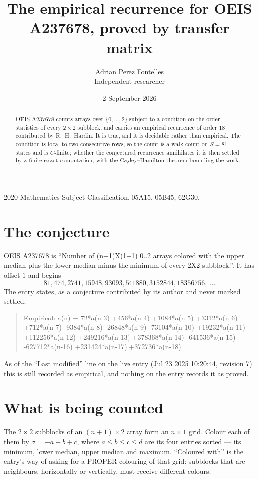 \documentclass[11pt,a4paper]{article}
\title{The empirical recurrence for OEIS A237678, proved by transfer matrix}
\author{Adrian Perez Fontelles\\ \small Independent researcher}
\date{2 September 2026}
\theoremstyle{plain}
\theoremstyle{definition}
\begin{document}
\maketitle

\begin{abstract}
OEIS A237678 counts arrays over $\{0,\dots,2\}$ subject to a condition on the order
statistics of every $2\times2$ subblock, and carries an empirical recurrence of order
$18$ contributed by R.~H.~Hardin. It is true, and it is decidable rather than empirical.
The condition is local to two consecutive rows, so the count is a walk count on $S=81$
states and is $C$-finite; whether the conjectured recurrence annihilates it is then settled by
a finite exact computation, with the Cayley--Hamilton theorem bounding the work.
\end{abstract}

\noindent\small 2020 Mathematics Subject Classification. 05A15, 05B45, 62G30.\normalsize

\section{The conjecture}

OEIS A237678 is ``Number of (n+1)X(1+1) 0..2 arrays colored with the upper median plus the lower median minus the minimum of every 2X2 subblock.''. It has offset $1$ and begins
\[
81, 474, 2741, 15948, 93093, 541880, 3152844, 18356756,\ \dots
\]
The entry states, as a conjecture contributed by its author and never marked settled:
\begin{quote}
Empirical: a(n) = 72*a(n-3) +456*a(n-4) +1084*a(n-5) +3312*a(n-6) +712*a(n-7) -9384*a(n-8) -26848*a(n-9) -73104*a(n-10) +19232*a(n-11) +112256*a(n-12) +249216*a(n-13) +378368*a(n-14) -641536*a(n-15) -627712*a(n-16) +231424*a(n-17) +372736*a(n-18)
\end{quote}
As of the ``Last modified'' line on the live entry (Jul 23 2025 10:20:44, revision 7) this is still
recorded as empirical, and nothing on the entry records it as proved.

\section{What is being counted}

The $2\times2$ subblocks of an $(n+1)\times2$ array form an
$n\times1$ grid. Colour each of them by $\sigma=-a+b+c$, where $a\le b\le c\le d$ are its four entries sorted --- its minimum, lower median, upper median and maximum. ``Coloured with'' is the entry's way of
asking for a PROPER colouring of that grid: subblocks that are neighbours, horizontally or
vertically, must receive different colours.
\end{document}

